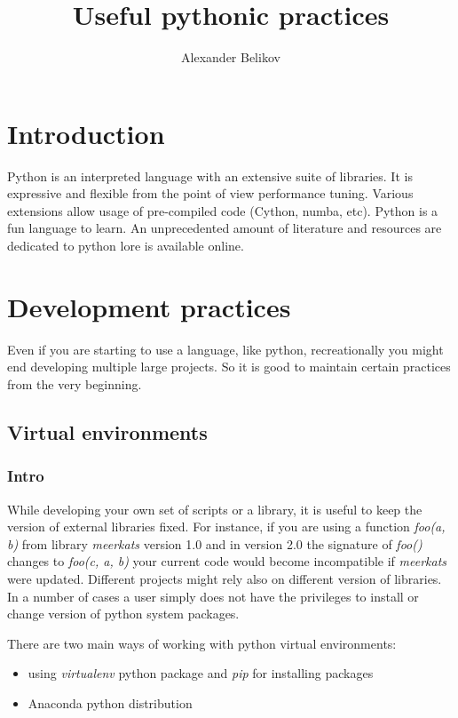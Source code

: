 \documentclass[article]{revtex4}
\begin{document}

\title{Useful pythonic practices}
\author{Alexander Belikov}

\maketitle


\section{Introduction}
Python is an interpreted language with an extensive suite of libraries. It is expressive and flexible from the point of view performance tuning. Various extensions allow usage of pre-compiled code (Cython, numba, etc).
Python is a fun language to learn. An unprecedented amount of literature and resources are dedicated to python lore is available online.

\section{Development practices}
Even if you are starting to use a language, like python, recreationally you might end developing multiple large projects. So it is good to maintain certain practices from the very beginning.


\subsection{Virtual environments}
\subsubsection{Intro}

While developing your own set of scripts or a library, it is useful to keep the version of external libraries fixed.
For instance, if you are using a function {\it foo(a, b)} from library {\it meerkats} version 1.0 and in version 2.0 the signature of {\it foo()} changes to {\it foo(c, a, b)} your current code would become incompatible if {\it meerkats} were updated.
Different projects might rely also on different version of libraries.
In a number of cases a user simply does not have the privileges to install or change version of python system packages.

There are two main ways of working with python virtual environments:
\begin{itemize}
    \item using {\it virtualenv} python package and {\it pip} for installing packages
    \item Anaconda python distribution
\end{itemize}
\end{document}
